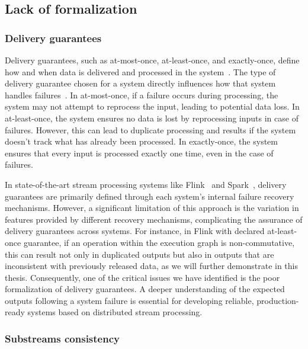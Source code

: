 \subsection{Lack of formalization}

\subsubsection{Delivery guarantees}

Delivery guarantees, such as at-most-once, at-least-once, and exactly-once, define how and when data is delivered and processed in the system~\cite{fragkoulis2024survey, carbone2018scalable, Akidau:2013:MFS:2536222.2536229}. The type of delivery guarantee chosen for a system directly influences how that system handles failures~\cite{zhang2024survey, silvestre2021clonos, wang2021consistency}. In at-most-once, if a failure occurs during processing, the system may not attempt to reprocess the input, leading to potential data loss. In at-least-once, the system ensures no data is lost by reprocessing inputs in case of failures. However, this can lead to duplicate processing and results if the system doesn't track what has already been processed. In exactly-once, the system ensures that every input is processed exactly one time, even in the case of failures.

In state-of-the-art stream processing systems like Flink~\cite{Carbone:2017:SMA:3137765.3137777} and Spark~\cite{Zaharia:2012:DSE:2342763.2342773}, delivery guarantees are primarily defined through each system's internal failure recovery mechanisms. However, a significant limitation of this approach is the variation in features provided by different recovery mechanisms, complicating the assurance of delivery guarantees across systems. For instance, in Flink with declared at-least-once guarantee, if an operation within the execution graph is non-commutative, this can result not only in duplicated outputs but also in outputs that are inconsistent with previously released data, as we will further demonstrate in this thesis. Consequently, one of the critical issues we have identified is the poor formalization of delivery guarantees. A deeper understanding of the expected outputs following a system failure is essential for developing reliable, production-ready systems based on distributed stream processing.

\subsubsection{Substreams consistency}


